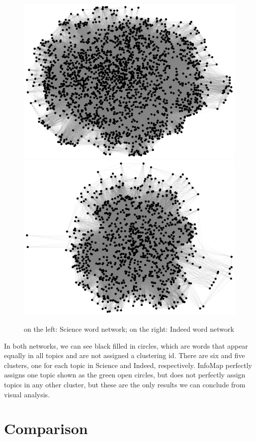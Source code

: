 \documentclass[12pt]{article}
\begin{document}
\begin{figure}[H]
	\centering
	\includegraphics[scale=0.5]{Images/Sci.png}
	\includegraphics[scale=0.5]{Images/Ind.png}
	\caption{on the left:  Science word network; on the right:  Indeed word network}
\end{figure}
In both networks, we can see black filled in circles, which are words that appear equally in all topics and are not assigned a clustering id. There are six and five clusters, one for each topic in Science and Indeed, respectively. InfoMap perfectly assigns one topic shown as the green open circles, but does not perfectly assign topics in any other cluster, but these are the only results we can conclude from visual analysis.

\section{Comparison}
\end{document}
